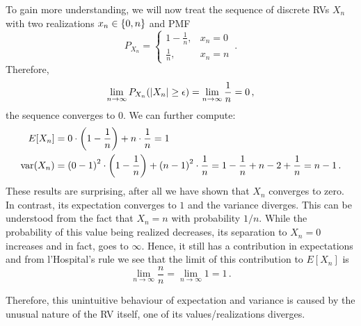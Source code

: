 \begin{ex}
To gain more understanding, we will now treat the sequence of discrete RVs $X_n$ with two realizations $x_n \in \qty{0, n}$ and PMF
\begin{equation*}
P_{X_n} = \begin{cases} 1 - \frac{1}{n}, & x_n = 0 \\ \frac{1}{n}, & x_n = n \end{cases} \, .
\end{equation*}
Therefore,
\begin{equation*}
\lim_{n \rightarrow \infty} P_{X_n}\qty(\abs{X_n} \geq \epsilon) = \lim_{n \rightarrow \infty} \frac{1}{n} = 0 \, ,
\end{equation*}
the sequence converges to $0$. We can further compute:
\begin{align*}
E[X_n] &= 0 \cdot \qty(1 - \frac{1}{n}) + n \cdot \frac{1}{n} = 1
\\
\operatorname{var}(X_n) &= \qty(0 - 1)^2 \cdot \qty(1 - \frac{1}{n}) + \qty(n - 1)^2 \cdot \frac{1}{n} = 1 - \frac{1}{n} + n - 2 + \frac{1}{n} = n - 1 \, .
\end{align*}
These results are surprising, after all we have shown that $X_n$ converges to zero. In contrast, its expectation converges to $1$ and the variance diverges. This can be understood from the fact that $X_n = n$ with probability $1 / n$. While the probability of this value being realized decreases, its separation to $X_n = 0$ increases and in fact, goes to $\infty$. Hence, it still has a contribution in expectations and from l'Hospital's rule we see that the limit of this contribution to $E[X_n]$ is
\begin{equation*}
\lim_{n \rightarrow \infty} \frac{n}{n} = \lim_{n \rightarrow \infty} 1 = 1 \, .
\end{equation*}

Therefore, this unintuitive behaviour of expectation and variance is caused by the unusual nature of the RV itself, one of its values/realizations diverges.

\end{ex}


